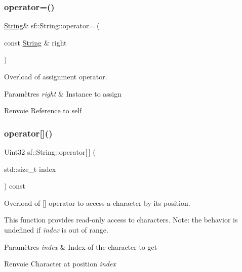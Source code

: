 \subsubsection{\texorpdfstring{operator=()}{operator=()}}
{\footnotesize\ttfamily \hyperlink{classsf_1_1String}{String}\& sf\+::\+String\+::operator= (\begin{DoxyParamCaption}\item[{const \hyperlink{classsf_1_1String}{String} \&}]{right }\end{DoxyParamCaption})}



Overload of assignment operator. 


\begin{DoxyParams}{Paramètres}
{\em right} & Instance to assign\\
\hline
\end{DoxyParams}
\begin{DoxyReturn}{Renvoie}
Reference to self 
\end{DoxyReturn}
\mbox{\label{classsf_1_1String_a035c1b585a0ebed81e773ecafed57926}} 
\subsubsection{\texorpdfstring{operator[]()}{operator[]()}\hspace{0.1cm}{\footnotesize\ttfamily [1/2]}}
{\footnotesize\ttfamily Uint32 sf\+::\+String\+::operator\mbox{[}$\,$\mbox{]} (\begin{DoxyParamCaption}\item[{std\+::size\+\_\+t}]{index }\end{DoxyParamCaption}) const}



Overload of \mbox{[}\mbox{]} operator to access a character by its position. 

This function provides read-\/only access to characters. Note\+: the behavior is undefined if {\itshape index} is out of range.


\begin{DoxyParams}{Paramètres}
{\em index} & Index of the character to get\\
\hline
\end{DoxyParams}
\begin{DoxyReturn}{Renvoie}
Character at position {\itshape index} 
\end{DoxyReturn}
\mbox{\label{classsf_1_1String_abc989da7f4fb873ab29188d40772ab24}} 
